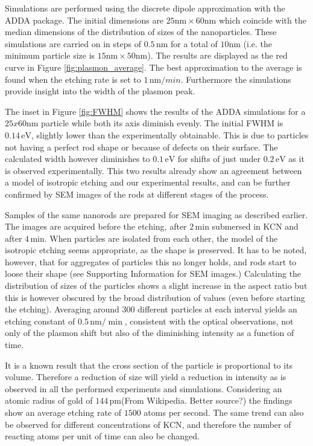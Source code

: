 \documentclass{article}
\begin{document}
Simulations are performed using the discrete dipole approximation with the ADDA
package\cite{Yurkin2011}. The initial dimensions are
$25\textrm{nm}\times60\textrm{nm}$ which coincide with the median dimensions of
the distribution of sizes of the nanoparticles. These simulations are carried on
in steps of $0.5\,\textrm{nm}$ for a total of $10\textrm{nm}$ (i.e. the minimum
particle size is $15\textrm{nm}\times 50 \textrm{nm}$). The results are
displayed as the red curve in Figure \ref{fig:plasmon_average}. The best
approximation to the average is found when the etching rate is set to
$1\,\textrm{nm}/min$. Furthermore the simulations provide insight into the width
of the plasmon peak.

The inset in Figure \ref{fig:FWHM} shows the results of the
ADDA\cite{Yurkin2011} simulations for a $25x60$nm particle while both its axis
diminish evenly. The initial FWHM is $0.14\,\textrm{eV}$, slightly lower than
the experimentally obtainable. This is due to particles not having a perfect rod
shape or because of defects on their surface. The calculated width however
diminishes to $0.1\,\textrm{eV}$ for shifts of just under $0.2\,\textrm{eV}$ as
it is observed experimentally. This two results already show an agreement
between a model of isotropic etching and our experimental results, and can be
further confirmed by SEM images of the rods at different stages of the process.

Samples of the same nanorods are prepared for SEM imaging as described earlier.
The images are acquired before the etching, after $2\,\textrm{min}$ submersed in
KCN and after $4\,\textrm{min}$. When particles are isolated from each other,
the model of the isotropic etching seems appropriate, as the shape is preserved.
It has to be noted, however, that for aggregates of particles this no longer
holds, and rods start to loose their shape (see Supporting Information for SEM
images.) Calculating the distribution of sizes of the particles shows a slight
increase in the aspect ratio but this is however obscured by the broad
distribution of values (even before starting the etching). Averaging around
$300$ different particles at each interval yields an etching constant of
$0.5\,\textrm{nm}/\min$, consistent with the optical observations, not only of
the plasmon shift but also of the diminishing intensity as a function of time. 

It is a known result that the cross section of the particle is proportional to
its volume. Therefore a reduction of size will yield a reduction in intensity as
is observed in all the performed experiments and simulations. Considering an
atomic radius of gold of $144\,\textrm{pm}$(From Wikipedia. Better source?) the
findings show an average etching rate of $1500$ atoms per second. The same trend 
can also be observed for different concentrations of KCN, and therefore the
number of reacting atoms per unit of time can also be changed.
\end{document}

